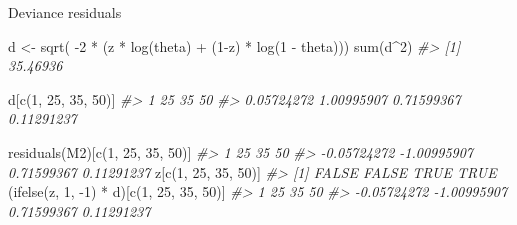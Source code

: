 \documentclass[
  10pt,
  ignorenonframetext,
]{beamer}
\newenvironment{Shaded}{\begin{snugshade}}{\end{snugshade}}
\newcommand{\CommentTok}[1]{\textcolor[rgb]{0.56,0.35,0.01}{\textit{#1}}}
\newcommand{\DecValTok}[1]{\textcolor[rgb]{0.00,0.00,0.81}{#1}}
\newcommand{\FunctionTok}[1]{\textcolor[rgb]{0.00,0.00,0.00}{#1}}
\newcommand{\NormalTok}[1]{#1}
\newcommand{\OtherTok}[1]{\textcolor[rgb]{0.56,0.35,0.01}{#1}}
\newcommand{\SpecialCharTok}[1]{\textcolor[rgb]{0.00,0.00,0.00}{#1}}
\begin{document}
\begin{frame}[fragile]{Deviance residuals}
\protect\hypertarget{deviance-residuals-1}{}
\begin{Shaded}
\begin{Highlighting}[]
\NormalTok{d }\OtherTok{\textless{}{-}} \FunctionTok{sqrt}\NormalTok{( }\SpecialCharTok{{-}}\DecValTok{2} \SpecialCharTok{*}\NormalTok{ (z }\SpecialCharTok{*} \FunctionTok{log}\NormalTok{(theta) }\SpecialCharTok{+}\NormalTok{ (}\DecValTok{1}\SpecialCharTok{{-}}\NormalTok{z) }\SpecialCharTok{*} \FunctionTok{log}\NormalTok{(}\DecValTok{1} \SpecialCharTok{{-}}\NormalTok{ theta)))}
\FunctionTok{sum}\NormalTok{(d}\SpecialCharTok{\^{}}\DecValTok{2}\NormalTok{)}
\CommentTok{\#\textgreater{} [1] 35.46936}
\end{Highlighting}
\end{Shaded}

\begin{Shaded}
\begin{Highlighting}[]
\NormalTok{d[}\FunctionTok{c}\NormalTok{(}\DecValTok{1}\NormalTok{, }\DecValTok{25}\NormalTok{, }\DecValTok{35}\NormalTok{, }\DecValTok{50}\NormalTok{)]}
\CommentTok{\#\textgreater{}          1         25         35         50 }
\CommentTok{\#\textgreater{} 0.05724272 1.00995907 0.71599367 0.11291237}
\end{Highlighting}
\end{Shaded}

\begin{Shaded}
\begin{Highlighting}[]
\FunctionTok{residuals}\NormalTok{(M2)[}\FunctionTok{c}\NormalTok{(}\DecValTok{1}\NormalTok{, }\DecValTok{25}\NormalTok{, }\DecValTok{35}\NormalTok{, }\DecValTok{50}\NormalTok{)]}
\CommentTok{\#\textgreater{}           1          25          35          50 }
\CommentTok{\#\textgreater{} {-}0.05724272 {-}1.00995907  0.71599367  0.11291237}
\NormalTok{z[}\FunctionTok{c}\NormalTok{(}\DecValTok{1}\NormalTok{, }\DecValTok{25}\NormalTok{, }\DecValTok{35}\NormalTok{, }\DecValTok{50}\NormalTok{)]}
\CommentTok{\#\textgreater{} [1] FALSE FALSE  TRUE  TRUE}
\NormalTok{(}\FunctionTok{ifelse}\NormalTok{(z, }\DecValTok{1}\NormalTok{, }\SpecialCharTok{{-}}\DecValTok{1}\NormalTok{) }\SpecialCharTok{*}\NormalTok{ d)[}\FunctionTok{c}\NormalTok{(}\DecValTok{1}\NormalTok{, }\DecValTok{25}\NormalTok{, }\DecValTok{35}\NormalTok{, }\DecValTok{50}\NormalTok{)]}
\CommentTok{\#\textgreater{}           1          25          35          50 }
\CommentTok{\#\textgreater{} {-}0.05724272 {-}1.00995907  0.71599367  0.11291237}
\end{Highlighting}
\end{Shaded}
\end{frame}
\end{document}
